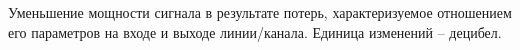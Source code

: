 Уменьшение мощности сигнала в результате потерь,
характеризуемое отношением его параметров на входе и выходе
линии/канала. Единица изменений -- децибел.